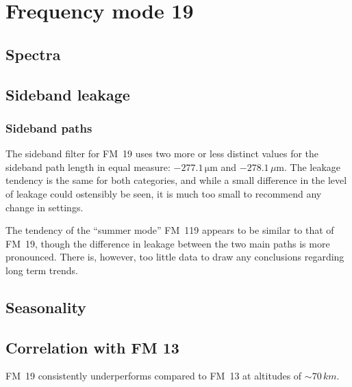 \section{Frequency mode 19}
\label{FM19}
\subsection{Spectra}
\label{FM19:spectra}

\subsection{Sideband leakage}
\label{FM19:sbl}
\subsubsection{Sideband paths}
\label{FM19:sbpath}
The sideband filter for FM~19 uses two more or less distinct values for the
sideband path length in equal measure: $-277.1\,\mathrm{\mu m}$ and
$-278.1\,\mu\mathrm{m}$.
The leakage tendency is the same for both categories, and while a small
difference in the level of leakage could ostensibly be seen, it is much too
small to recommend any change in settings.

The tendency of the ``summer mode'' FM~119 appears to be similar to that of
FM~19, though the difference in leakage between the two main paths is more
pronounced.
There is, however, too little data to draw any conclusions
regarding long term trends.

\subsection{Seasonality}
\label{FM19:seasonality}

\subsection{Correlation with FM 13}
\label{FM19:FM13:corr}
FM~19 consistently underperforms compared to FM~13 at altitudes of
$\sim70\,km$.
